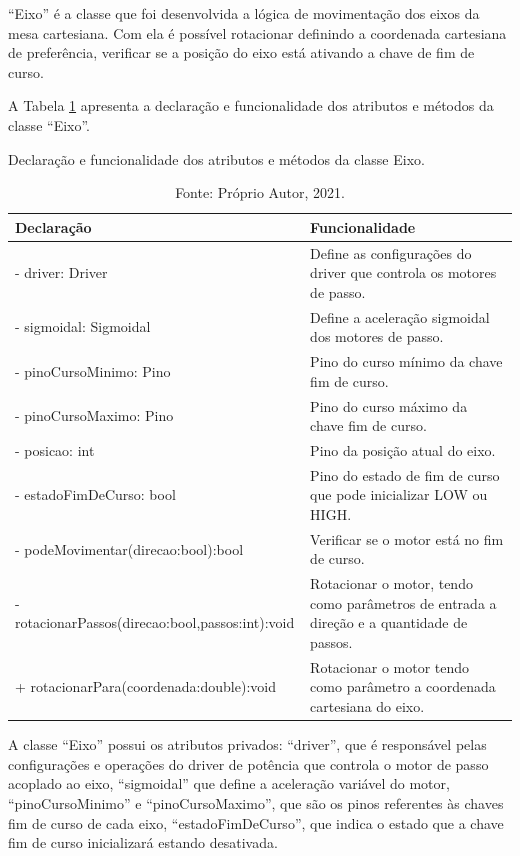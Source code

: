 “Eixo” é a classe que foi desenvolvida a lógica de movimentação dos eixos da mesa cartesiana. Com ela é 
possível rotacionar definindo a coordenada cartesiana de preferência, verificar se a posição do eixo 
está ativando a chave de fim de curso.

A Tabela \ref{tab:classeeixo} apresenta a declaração e funcionalidade dos atributos e métodos da 
classe “Eixo”.

\begin{table}[H]
    \centering
    \caption{Declaração e funcionalidade dos atributos e métodos da classe Eixo.}
    \begin{tabular}{lp{6cm}}
        \hline
        \textbf{Declaração} & \textbf{Funcionalidade}\\
        \hline
        - driver: Driver & Define as configurações do driver que controla os motores de passo.\\
        - sigmoidal: Sigmoidal & Define a aceleração sigmoidal dos motores de passo.\\
        - pinoCursoMinimo: Pino & Pino do curso mínimo da chave fim de curso.\\
        - pinoCursoMaximo: Pino & Pino do curso máximo da chave fim de curso.\\
        - posicao: int & Pino da posição atual do eixo.\\
        - estadoFimDeCurso: bool & Pino do estado de fim de curso que pode inicializar LOW ou HIGH.\\
        - podeMovimentar(direcao:bool):bool & Verificar se o motor está no fim de curso.\\
        - rotacionarPassos(direcao:bool,passos:int):void & Rotacionar o motor, tendo como parâmetros de entrada a direção e a quantidade de passos.\\
        + rotacionarPara(coordenada:double):void & Rotacionar o motor tendo como parâmetro a coordenada cartesiana do eixo.\\
        \hline       
    \end{tabular}
    \caption*{Fonte: Próprio Autor, 2021.}
    \label{tab:classeeixo}
\end{table}

A classe “Eixo” possui os atributos privados: “driver”, que é responsável pelas configurações e operações 
do driver de potência que controla o motor de passo acoplado ao eixo, “sigmoidal” que define a aceleração 
variável do motor, “pinoCursoMinimo” e “pinoCursoMaximo”, que são os pinos referentes às chaves fim de 
curso de cada eixo, “estadoFimDeCurso”, que indica o estado que a chave fim de curso inicializará estando 
desativada. 

